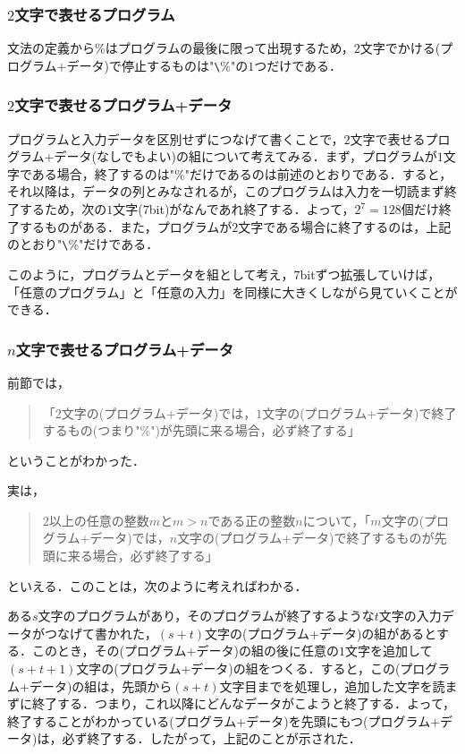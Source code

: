 \documentclass{jarticle}
\begin{document}
\subsubsection{$2$文字で表せるプログラム}
文法の定義から\%はプログラムの最後に限って出現するため，$2$文字でかける(プログラム+データ)で停止するものは"\verb+\+\%"の$1$つだけである．

\subsubsection{$2$文字で表せるプログラム+データ}
プログラムと入力データを区別せずにつなげて書くことで，$2$文字で表せるプログラム+データ(なしでもよい)の組について考えてみる．まず，プログラムが$1$文字である場合，終了するのは"\%"だけであるのは前述のとおりである．すると，それ以降は，データの列とみなされるが，このプログラムは入力を一切読まず終了するため，次の$1$文字($7$bit)がなんであれ終了する．よって，$2^7=128$個だけ終了するものがある．また，プログラムが$2$文字である場合に終了するのは，上記のとおり"\verb+\+\%"だけである．

このように，プログラムとデータを組として考え，$7$bitずつ拡張していけば，「任意のプログラム」と「任意の入力」を同様に大きくしながら見ていくことができる．

\subsubsection{$n$文字で表せるプログラム+データ}
\label{sec:exp}

前節では，
\begin{quote}
	「$2$文字の(プログラム+データ)では，$1$文字の(プログラム+データ)で終了するもの(つまり"\%")が先頭に来る場合，必ず終了する」
\end{quote}
ということがわかった．

実は，
\begin{quote}
	$2$以上の任意の整数$m$と$m>n$である正の整数$n$について，「$m$文字の(プログラム+データ)では，$n$文字の(プログラム+データ)で終了するものが先頭に来る場合，必ず終了する」
\end{quote}
といえる．このことは，次のように考えればわかる．

ある$s$文字のプログラムがあり，そのプログラムが終了するような$t$文字の入力データがつなげて書かれた，$(s+t)$文字の(プログラム+データ)の組があるとする．このとき，その(プログラム+データ)の組の後に任意の$1$文字を追加して$(s+t+1)$文字の(プログラム+データ)の組をつくる．すると，この(プログラム+データ)の組は，先頭から$(s+t)$文字目までを処理し，追加した文字を読まずに終了する．つまり，これ以降にどんなデータがこようと終了する．よって，終了することがわかっている(プログラム+データ)を先頭にもつ(プログラム+データ)は，必ず終了する．したがって，上記のことが示された．
\end{document}
